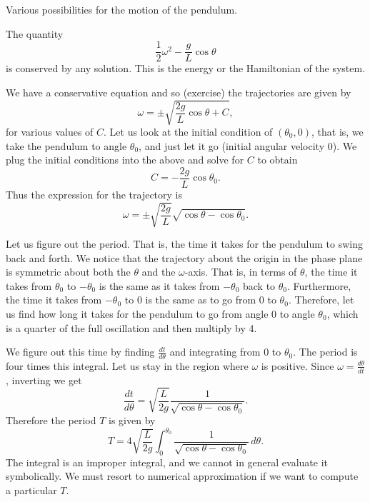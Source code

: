 \begin{myfig}
\capstart
{}
\caption{Various possibilities for the motion of the pendulum. \label{fig:nlin-pend}}
\end{myfig}

The quantity 
\begin{equation*}
\frac{1}{2} \omega^2  - \frac{g}{L} \cos \theta 
\end{equation*}
is conserved by any solution.  This is the energy or the Hamiltonian of
the system.

We have a conservative equation and so (exercise) the
trajectories are given by
\begin{equation*}
\omega = \pm \sqrt{ \frac{2g}{L} \cos \theta + C} ,
\end{equation*}
for various values of $C$.  
Let us look at the initial condition of $(\theta_0,0)$,
that is, we take the pendulum to
angle $\theta_0$, and just let it go (initial angular velocity 0).
We plug the initial conditions into the above and solve for $C$ to obtain
\begin{equation*}
C = - \frac{2g}{L} \cos \theta_0 .
\end{equation*}
Thus the expression for the trajectory is
\begin{equation*}
\omega = \pm \sqrt{ \frac{2g}{L}} \sqrt{ \cos \theta - \cos \theta_0 } .
\end{equation*}

Let us figure out the period.  That is, the time it takes for the pendulum
to swing back and forth.
We notice that the trajectory about the
origin in the phase plane is symmetric about both the $\theta$ and the
$\omega$-axis.  That is, in terms of $\theta$,
the time it takes from $\theta_0$ to $-\theta_0$
is the same as it takes from $-\theta_0$ back to $\theta_0$.  Furthermore,
the time it takes from $-\theta_0$ to $0$ is the same as to go from $0$ to
$\theta_0$.  Therefore, let us find how long it takes for
the pendulum to go from angle 0 to angle $\theta_0$, which is a quarter of
the full oscillation and then multiply by 4.

We figure out this time by finding
$\frac{dt}{d\theta}$ and integrating from $0$ to $\theta_0$.
The period is four times
this integral.  Let us stay in the region where $\omega$ is positive.
Since $\omega = \frac{d\theta}{dt}$, inverting we get
\begin{equation*}
\frac{dt}{d\theta} = \sqrt{\frac{L}{2g}} \frac{1}{\sqrt{\cos \theta - \cos \theta_0 }} .
\end{equation*}
Therefore the period $T$ is given by
\begin{equation*}
T = 4 \sqrt{\frac{L}{2g}} \int_0^{\theta_0} \frac{1}{\sqrt{\cos \theta -
\cos \theta_0 }}\, d\theta .
\end{equation*}
The integral is an improper integral, and we cannot in
general evaluate it symbolically.  We must resort to numerical
approximation if we want to compute a particular $T$.

